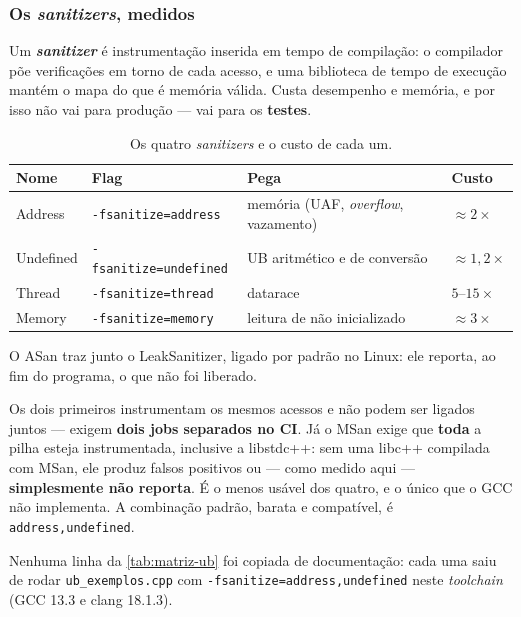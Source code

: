 \subsubsection{Os \emph{sanitizers}, medidos}
\label{sec:ub-sanitizers}

Um \textbf{\emph{sanitizer}} é instrumentação inserida em tempo de compilação: o
compilador põe verificações em torno de cada acesso, e uma biblioteca de tempo de
execução mantém o mapa do que é memória válida. Custa desempenho e memória, e por
isso não vai para produção --- vai para os \textbf{testes}.

\begin{table}[htbp]
\centering
\caption{Os quatro \emph{sanitizers} e o custo de cada um.}
\label{tab:sanitizers}
\footnotesize
\begin{tabular}{@{}llll@{}}
\toprule
\textbf{Nome} & \textbf{Flag} & \textbf{Pega} & \textbf{Custo} \\
\midrule
Address   & \texttt{-fsanitize=address}   & memória (UAF, \emph{overflow}, vazamento) & ${\approx}2\times$ \\
Undefined & \texttt{-fsanitize=undefined} & UB aritmético e de conversão & ${\approx}1{,}2\times$ \\
Thread    & \texttt{-fsanitize=thread}    & \gls{datarace}   & $5$--$15\times$ \\
Memory    & \texttt{-fsanitize=memory}    & leitura de não inicializado & ${\approx}3\times$ \\
\bottomrule
\end{tabular}
\end{table}

O ASan traz junto o LeakSanitizer, ligado por padrão no Linux: ele reporta, ao fim
do programa, o que não foi liberado.

\begin{armadilha}
Os dois primeiros instrumentam os mesmos acessos e não podem ser ligados juntos
--- exigem \textbf{dois jobs separados no CI}. Já o MSan exige que \textbf{toda} a
pilha esteja instrumentada, inclusive a libstdc++: sem uma libc++ compilada com
MSan, ele produz falsos positivos ou --- como medido aqui --- \textbf{simplesmente
não reporta}. É o menos usável dos quatro, e o único que o GCC não implementa. A
combinação padrão, barata e compatível, é \texttt{address,undefined}.
\end{armadilha}

Nenhuma linha da \cref{tab:matriz-ub} foi copiada de documentação: cada uma saiu
de rodar \texttt{ub\_exemplos.cpp} com \texttt{-fsanitize=address,undefined} neste
\emph{toolchain} (GCC 13.3 e clang 18.1.3).

